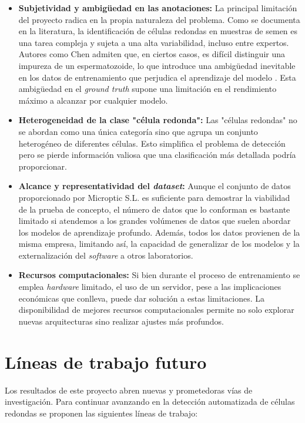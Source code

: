 \documentclass[12pt,a4paper,onecolumn,oneside]{report}
\begin{document}
\begin{itemize}
  \item \textbf{Subjetividad y ambigüedad en las anotaciones:} La principal limitación del proyecto radica en la propia naturaleza del problema. Como se documenta en la literatura, 
  la identificación de células redondas en muestras de semen es una tarea compleja y sujeta a una alta variabilidad, incluso entre expertos. Autores como Chen admiten que,
  en ciertos casos, es difícil distinguir una impureza de un espermatozoide, lo que introduce una ambigüedad inevitable en los datos de entrenamiento que perjudica el aprendizaje del modelo \cite{chen2024}.
  Esta ambigüedad en el \textit{ground truth} supone una limitación en el rendimiento máximo a alcanzar por cualquier modelo.
  \item \textbf{Heterogeneidad de la clase "célula redonda":} Las "células redondas" no se abordan como una única categoría sino que agrupa un conjunto heterogéneo de diferentes células. Esto simplifica el problema de detección pero se pierde información valiosa 
  que una clasificación más detallada podría proporcionar.
  \item \textbf{Alcance y representatividad del \textit{dataset}:} Aunque el conjunto de datos proporcionado por Microptic S.L. \cite{microptic} es suficiente para demostrar la viabilidad de la prueba de concepto, 
  el número de datos que lo conforman es bastante limitado si atendemos a los grandes volúmenes de datos que suelen abordar los modelos de aprendizaje profundo. Además, todos los datos provienen de la misma empresa, limitando así, la capacidad de generalizar de los modelos
  y la externalización del \textit{software} a otros laboratorios.
  \item \textbf{Recursos computacionales:} Si bien durante el proceso de entrenamiento se emplea \textit{hardware} limitado, el uso de un servidor, pese a las implicaciones económicas que conlleva, puede dar solución a estas limitaciones.
  La disponibilidad de mejores recursos computacionales permite no solo explorar nuevas arquitecturas sino realizar ajustes más profundos.
\end{itemize}

\section{Líneas de trabajo futuro}
\label{sec:Lineas de trabajo futuro}

Los resultados de este proyecto abren nuevas y prometedoras vías de investigación. Para continuar avanzando en la detección automatizada de células redondas se proponen las siguientes líneas de trabajo:
\end{document}
